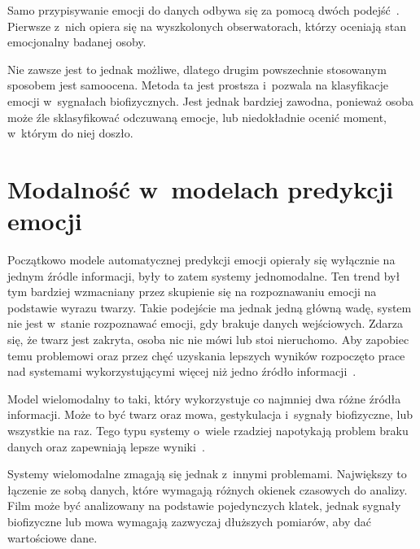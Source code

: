 Samo przypisywanie emocji do danych odbywa się za pomocą dwóch podejść~\cite{Calvo2015}.
Pierwsze z~nich opiera się na wyszkolonych obserwatorach, którzy oceniają stan emocjonalny badanej osoby.

Nie zawsze jest to jednak możliwe, dlatego drugim powszechnie stosowanym sposobem jest samoocena.
Metoda ta jest prostsza i~pozwala na klasyfikacje emocji w~sygnałach biofizycznych.
Jest jednak bardziej zawodna, ponieważ osoba może źle sklasyfikować odczuwaną emocje, lub niedokładnie ocenić moment, w~którym do niej doszło.

\section{Modalność w~modelach predykcji emocji}\label{sec:modalnosc-w-modelach-predykcji-emocji}

Początkowo modele automatycznej predykcji emocji opierały się wyłącznie na jednym źródle informacji, były to zatem systemy jednomodalne.
Ten trend był tym bardziej wzmacniany przez skupienie się na rozpoznawaniu emocji na podstawie wyrazu twarzy.
Takie podejście ma jednak jedną główną wadę, system nie jest w~stanie rozpoznawać emocji, gdy brakuje danych wejściowych.
Zdarza się, że twarz jest zakryta, osoba nic nie mówi lub stoi nieruchomo.
Aby zapobiec temu problemowi oraz przez chęć uzyskania lepszych wyników rozpoczęto prace nad systemami wykorzystującymi więcej niż jedno źródło informacji~\cite{Calvo2015}.

Model wielomodalny to taki, który wykorzystuje co najmniej dwa różne źródła informacji.
Może to być twarz oraz mowa, gestykulacja i~sygnały biofizyczne, lub wszystkie na raz.
Tego typu systemy o~wiele rzadziej napotykają problem braku danych oraz zapewniają lepsze wyniki~\cite{DMello2012}.

Systemy wielomodalne zmagają się jednak z~innymi problemami.
Największy to łączenie ze sobą danych, które wymagają różnych okienek czasowych do analizy.
Film może być analizowany na podstawie pojedynczych klatek, jednak sygnały biofizyczne lub mowa wymagają zazwyczaj dłuższych pomiarów, aby dać wartościowe dane.
